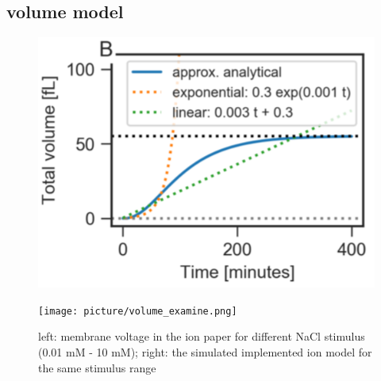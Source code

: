 \subsection{volume model}
\begin{figure}[htbp]
	
	\begin{minipage}{0,5\textwidth}
		
		\includegraphics[width=\textwidth]{picture/Volume_Paper.png}
		
		\label{IonPadper} 
	\end{minipage}
	\begin{minipage}{0,5\textwidth}
		
		\texttt{[image: picture/volume\_examine.png]}
		
		\label{IonImpledmented} 
	\end{minipage}
	\caption{left: membrane voltage in the ion paper for different NaCl stimulus (0.01 mM - 10 mM); right: the simulated implemented ion model for the same stimulus range }
\end{figure}


